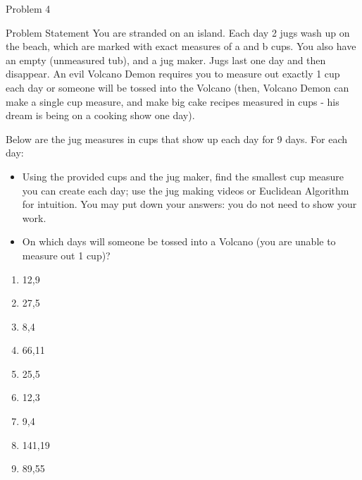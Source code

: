 \begin{problem}{Problem 4}
    \begin{statement}{Problem Statement}
        You are stranded on an island. Each day 2 jugs wash up on the beach, which are marked with exact measures of a and b cups. You also have an empty (unmeasured tub), and a jug maker. Jugs last 
        one day and then disappear. An evil Volcano Demon requires you to measure out exactly 1 cup each day or someone will be tossed into the Volcano (then, Volcano Demon can make a single cup 
        measure, and make big cake recipes measured in cups - his dream is being on a cooking show one day).

        Below are the jug measures in cups that show up each day for 9 days. For each day:
        
        \begin{itemize}
            \item Using the provided cups and the jug maker, find the smallest cup measure you can create each day; use the jug making videos or Euclidean Algorithm for intuition. You may put down 
            your answers: you do not need to show your work.
            \item On which days will someone be tossed into a Volcano (you are unable to measure out 1 cup)?
        \end{itemize}

        \begin{enumerate}
            \item 12,9
            \item 27,5
            \item 8,4
            \item 66,11
            \item 25,5
            \item 12,3
            \item 9,4
            \item 141,19
            \item 89,55
        \end{enumerate}
    \end{statement}


\end{problem}
